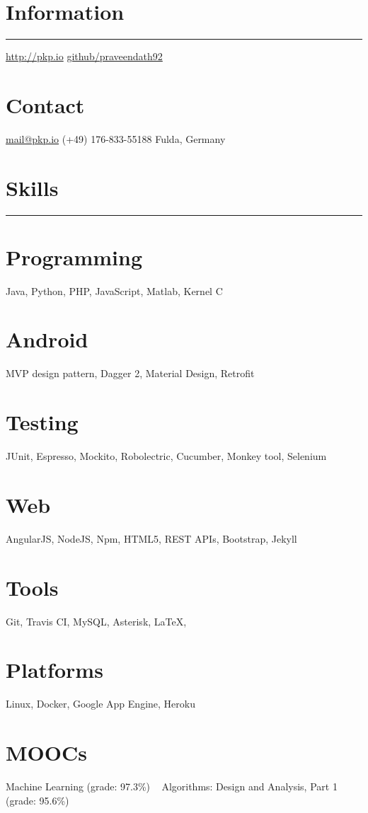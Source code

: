 \documentclass[]{friggeri-cv}
\begin{document}

\begin{aside}
  \section{Information}
    \noindent\rule{3cm}{0.5pt}
    \href{http://pkp.io}{http://pkp.io}
    \href{https://github.com/praveendath92}{github/praveendath92}    
  \section{Contact}
    \href{mailto:mail@pkp.io}{mail@pkp.io}
    (+49) 176-833-55188
    Fulda, Germany
    ~
  \section{Skills}
    \noindent\rule{3cm}{0.5pt}
  \section{Programming}
    Java, Python, PHP, JavaScript, Matlab, Kernel C
  \section{Android}
    MVP design pattern, Dagger 2, Material Design, Retrofit
  \section{Testing}
    JUnit, Espresso, Mockito, Robolectric, Cucumber, Monkey tool, Selenium
  \section{Web}
    AngularJS, NodeJS, Npm, HTML5, REST APIs, Bootstrap, Jekyll
  \section{Tools}
    Git, Travis CI, MySQL, Asterisk, \LaTeX, 
  \section{Platforms}
    Linux, Docker, Google App Engine, Heroku
  \section{MOOCs}
    Machine Learning (grade: 97.3\%)
    ~
    Algorithms: Design and Analysis, Part 1 (grade: 95.6\%)
\end{aside}
~
\end{document}
